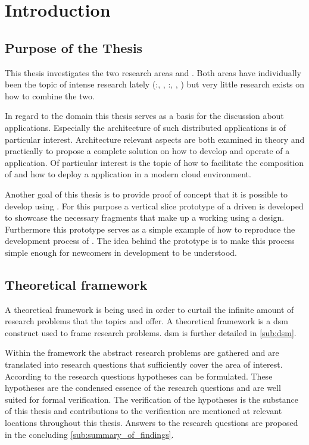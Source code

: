 \chapter{Introduction}

\section{Purpose of the Thesis}

This thesis investigates the two research areas \mss{} and
\ogs{}. Both areas have individually been the topic of intense research lately
(\mss{}:\cite{zimmermann2016microservices}, \cite{di2017research},
\ogs{}:\cite{bosch2017towards}, \cite{smed2017algorithms},
\cite{liu2017apparatus}) but very little research exists on how to combine the
two.

In regard to the \mss{} domain this thesis serves as a basis for the discussion
about \ms{} applications. Especially the architecture of such distributed \ms{}
applications is of particular interest. Architecture relevant aspects are both
examined in theory and practically to propose a complete solution on how to
develop and operate of a \ms{} application. Of particular interest is the topic
of how to facilitate the composition of \mss{} and how to deploy a \ms{}
application in a modern cloud environment.

Another goal of this thesis is to provide proof of concept that it is possible
to develop \ogs{} using \mss{}. For this purpose a vertical slice prototype of a
\ms{} driven \og{} is developed to showcase the necessary fragments that make up
a working \og{} using a \ms{} design. Furthermore this prototype serves as a
simple example of how to reproduce the development process of \ogs{}. The idea
behind the prototype is to make this process simple enough for newcomers in
\og{} development to be understood.


\section{Theoretical framework}
\label{sec:theoretical_framework}

A theoretical framework is being used in order to curtail the infinite amount of
research problems that the topics \ogs{} and \mss{} offer. A theoretical
framework is a \gls{dsm} construct used to frame research problems. \gls{dsm} is
further detailed in \autoref{sub:dsm}.

Within the framework the abstract research problems are gathered and are
translated into research questions that sufficiently cover the area of interest.
According to the research questions hypotheses can be formulated. These
hypotheses are the condensed essence of the research questions and are well
suited for formal verification. The verification of the hypotheses is the
substance of this thesis and contributions to the verification are mentioned at
relevant locations throughout this thesis. Answers to the research questions
are proposed in the concluding \autoref{sub:summary_of_findings}.

